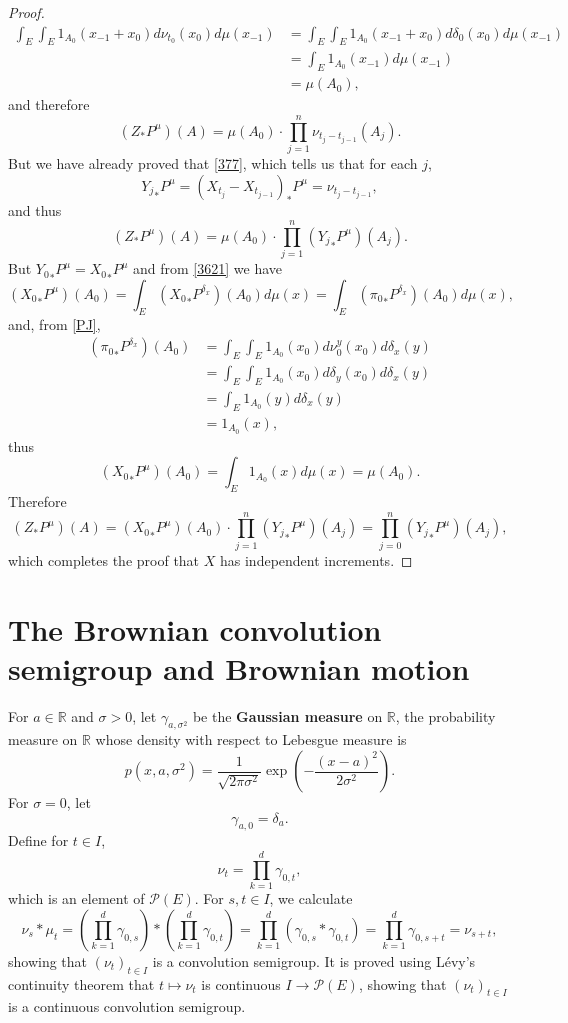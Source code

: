 \documentclass{article}
\theoremstyle{definition}
\begin{document}
\begin{proof}
\begin{align*}
\int_E \int_E 1_{A_0}(x_{-1}+x_0) d\nu_{t_0}(x_0) d\mu(x_{-1})&=
\int_E \int_E 1_{A_0}(x_{-1}+x_0) d\delta_0(x_0) d\mu(x_{-1})\\
&=\int_E 1_{A_0}(x_{-1}) d\mu(x_{-1})\\
&=\mu(A_0),
\end{align*}
and therefore
\[
(Z_* P^\mu)(A) = \mu(A_0) \cdot \prod_{j=1}^n \nu_{t_j-t_{j-1}}(A_j).
\]
But we have already proved that \eqref{377}, which tells us that for each $j$,
\[
{Y_j}_*P^\mu = (X_{t_j}-X_{t_{j-1}})_*P^\mu=\nu_{t_j-t_{j-1}},
\]
and thus
\[
(Z_* P^\mu)(A)  = \mu(A_0) \cdot \prod_{j=1}^n ({Y_j}_*P^\mu) (A_j).
\]
But  ${Y_0}_*P^\mu = {X_0}_*P^\mu$ and from \eqref{3621}  we have
\[
({X_0}_*P^\mu)(A_0) = \int_E ({X_0}_*P^{\delta_x})(A_0) d\mu(x) =
\int_E ({\pi_0}_* P^{\delta_x})(A_0) d\mu(x),
\]
and, from \eqref{PJ},
\begin{align*}
({\pi_0}_* P^{\delta_x})(A_0)&=\int_E \int_E 1_{A_0}(x_0) d\nu_0^y(x_0) d\delta_x(y)\\
&=\int_E \int_E 1_{A_0}(x_0) d\delta_y(x_0) d\delta_x(y)\\
&=\int_E 1_{A_0}(y) d\delta_x (y)\\
&=1_{A_0}(x),
\end{align*}
thus
\[
({X_0}_*P^\mu)(A_0)  = \int_E 1_{A_0}(x) d\mu(x) = \mu(A_0).
\]
Therefore
\[
(Z_* P^\mu)(A) 
=({X_0}_*P^\mu)(A_0)  \cdot \prod_{j=1}^n ({Y_j}_*P^\mu) (A_j)
=\prod_{j=0}^n ({Y_j}_*P^\mu) (A_j),
\]
which completes the proof that $X$ has independent increments.
\end{proof}




\section{The Brownian convolution semigroup and Brownian motion}
For $a \in \mathbb{R}$ and $\sigma>0$,
let $\gamma_{a,\sigma^2}$ be the \textbf{Gaussian measure} on $\mathbb{R}$, the probability measure on $\mathbb{R}$
whose density with respect to Lebesgue measure is
\[
p(x,a,\sigma^2) = \frac{1}{\sqrt{2\pi \sigma^2}} \exp\left(-\frac{(x-a)^2}{2\sigma^2}\right).
\]
For $\sigma=0$, let
\[
\gamma_{a,0} = \delta_a.
\]
Define for $t  \in I$,
\[
\nu_t = \prod_{k=1}^d \gamma_{0,t},
\]
which is an element of $\mathscr{P}(E)$. 
For $s,t  \in I$, we calculate
\[
\nu_s * \mu_t =  \left(\prod_{k=1}^d \gamma_{0,s}\right) * \left( \prod_{k=1}^d \gamma_{0,t} \right) 
=\prod_{k=1}^d (\gamma_{0,s} * \gamma_{0,t})
=\prod_{k=1}^d \gamma_{0,s+t}
=\nu_{s+t},
\]
showing that $(\nu_t)_{t \in I}$ is a convolution semigroup.
It is proved using L\'evy's continuity theorem that $t \mapsto \nu_t$ is continuous $I \to \mathscr{P}(E)$, showing that
$(\nu_t)_{t  \in I}$ is a continuous convolution semigroup.
\end{document}
